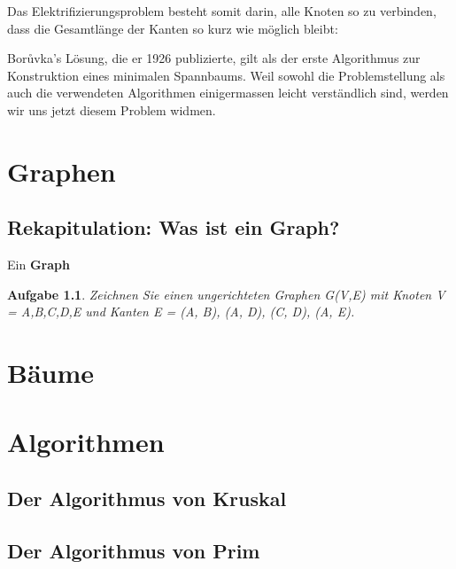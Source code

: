 \documentclass[12pt]{report}
\theoremstyle{break}
\newtheorem{exercise}{Aufgabe}[section]
\begin{document}
Das Elektrifizierungsproblem besteht somit darin, alle Knoten so zu
verbinden, dass die Gesamtl\"{a}nge der Kanten so kurz wie m\"{o}glich bleibt:  

Bor\r{u}vka's L\"{o}sung, die er 1926 publizierte, gilt als der erste
Algorithmus zur Konstruktion eines minimalen Spannbaums. Weil sowohl
die Problemstellung als auch die verwendeten Algorithmen einigermassen
leicht verst\"{a}ndlich sind, werden wir uns jetzt diesem Problem widmen.

\chapter{Graphen}
\label{graphs}

\section{Rekapitulation: Was ist ein Graph?}

Ein \textbf{Graph}

\begin{exercise}
Zeichnen Sie einen ungerichteten Graphen G(V,E) mit Knoten V =
{A,B,C,D,E} und Kanten E = {(A, B), (A, D), (C, D), (A, E)}.
\end{exercise}
 
\chapter{B\"{a}ume}
\chapter{Algorithmen}
\section{Der Algorithmus von Kruskal}
\section{Der Algorithmus von Prim}
\end{document}
